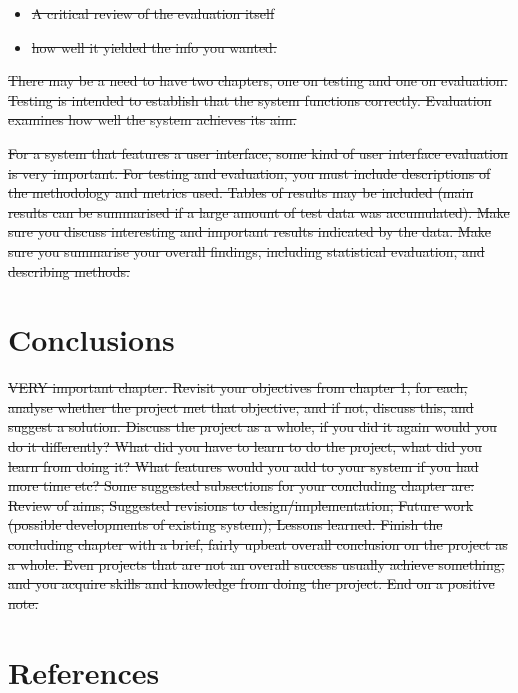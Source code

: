 \documentclass[12pt,a4paper,]{adreport}
\begin{document}
\begin{itemize}
\itemsep1pt\parskip0pt
\item
  \sout{A critical review of the evaluation itself}
\item
  \sout{how well it yielded the info you wanted.}
\end{itemize}

\sout{There may be a need to have two chapters, one on testing and one
on evaluation. Testing is intended to establish that the system
functions correctly. Evaluation examines how well the system achieves
its aim.}

\sout{For a system that features a user interface, some kind of user
interface evaluation is very important. For testing and evaluation, you
must include descriptions of the methodology and metrics used. Tables of
results may be included (main results can be summarised if a large
amount of test data was accumulated). Make sure you discuss interesting
and important results indicated by the data. Make sure you summarise
your overall findings, including statistical evaluation, and describing
methods.}

\chapter{Conclusions}\label{conclusions}

\sout{VERY important chapter. Revisit your objectives from chapter 1,
for each, analyse whether the project met that objective, and if not,
discuss this, and suggest a solution. Discuss the project as a whole, if
you did it again would you do it differently? What did you have to learn
to do the project, what did you learn from doing it? What features would
you add to your system if you had more time etc? Some suggested
subsections for your concluding chapter are: Review of aims; Suggested
revisions to design/implementation; Future work (possible developments
of existing system); Lessons learned. Finish the concluding chapter with
a brief, fairly upbeat overall conclusion on the project as a whole.
Even projects that are not an overall success usually achieve something,
and you acquire skills and knowledge from doing the project. End on a
positive note.}

\chapter{References}\label{references}
\end{document}
